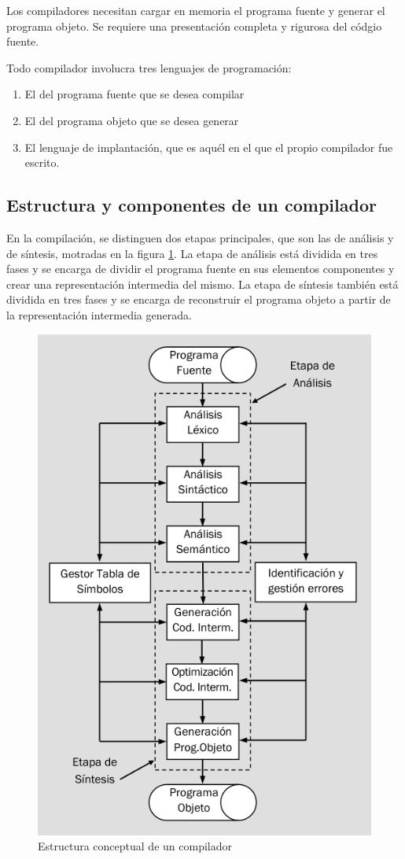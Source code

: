 \documentclass[12pt]{article}
\begin{document}
Los compiladores necesitan cargar en memoria el programa fuente y generar el programa objeto. Se requiere una presentación completa y rigurosa del códgio fuente.

Todo compilador involucra tres lenguajes de programación:
\begin{enumerate}[1.]
	\item El del programa fuente que se desea compilar

	\item El del programa objeto que se desea generar

	\item El lenguaje de implantación, que es aquél en el que el propio compilador fue escrito.
\end{enumerate}

\subsection{Estructura y componentes de un compilador}
En la compilación, se distinguen dos etapas principales, que son las de análisis y de síntesis, motradas en la figura \ref{fig:estructura_compilador}. La etapa de análisis está dividida en tres fases y se encarga de dividir el programa fuente en sus elementos componentes y crear una representación intermedia del mismo. La etapa de síntesis también está dividida en tres fases y se encarga de reconstruir el programa objeto a partir de la representación intermedia generada.

\begin{figure}[H]
	\centering
	\includegraphics[width=0.4\linewidth]{imagenes/estructura_compilador.png}
	\caption{Estructura conceptual de un compilador}
	\label{fig:estructura_compilador}
\end{figure}
\end{document}
